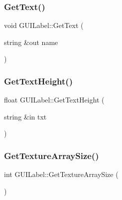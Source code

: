 \hypertarget{class_g_u_i_label_af00099b304803c7f5651e5feadccf577}{}\label{class_g_u_i_label_af00099b304803c7f5651e5feadccf577} 
\subsubsection{\texorpdfstring{Get\+Text()}{GetText()}}
{\footnotesize\ttfamily void G\+U\+I\+Label\+::\+Get\+Text (\begin{DoxyParamCaption}\item[{string \&out}]{name }\end{DoxyParamCaption})}

\hypertarget{class_g_u_i_label_a518d64b0380d931930737b9203ced913}{}\label{class_g_u_i_label_a518d64b0380d931930737b9203ced913} 
\subsubsection{\texorpdfstring{Get\+Text\+Height()}{GetTextHeight()}}
{\footnotesize\ttfamily float G\+U\+I\+Label\+::\+Get\+Text\+Height (\begin{DoxyParamCaption}\item[{string \&in}]{txt }\end{DoxyParamCaption})}

\hypertarget{class_g_u_i_label_a65d66e0aa600e818b56ed602e2e0dab2}{}\label{class_g_u_i_label_a65d66e0aa600e818b56ed602e2e0dab2} 
\subsubsection{\texorpdfstring{Get\+Texture\+Array\+Size()}{GetTextureArraySize()}}
{\footnotesize\ttfamily int G\+U\+I\+Label\+::\+Get\+Texture\+Array\+Size (\begin{DoxyParamCaption}{ }\end{DoxyParamCaption})}

\hypertarget{class_g_u_i_label_a5177dd41a756e94d4260f6db3cc1d8d1}{}\label{class_g_u_i_label_a5177dd41a756e94d4260f6db3cc1d8d1} 
